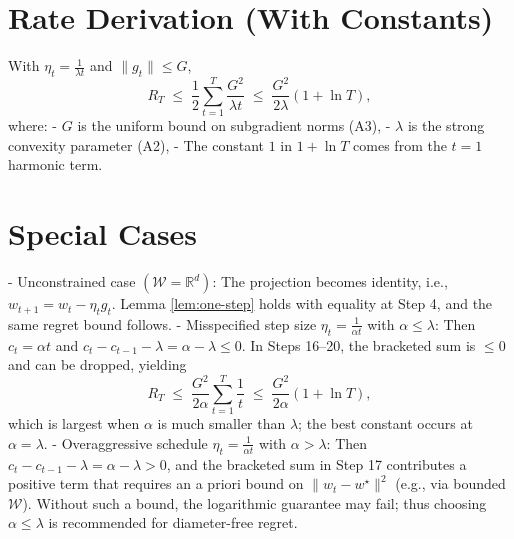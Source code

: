 \documentclass[12pt]{article}
\begin{document}
\section*{Rate Derivation (With Constants)}
With $\eta_t = \frac{1}{\lambda t}$ and $\|g_t\|\le G$,
\[
R_T \;\le\; \frac{1}{2}\sum_{t=1}^T \frac{G^2}{\lambda t} 
\;\le\; \frac{G^2}{2\lambda}\left(1+\ln T\right),
\]
where:
- $G$ is the uniform bound on subgradient norms (A3),
- $\lambda$ is the strong convexity parameter (A2),
- The constant $1$ in $1+\ln T$ comes from the $t=1$ harmonic term.

\section*{Special Cases}
- Unconstrained case $(\mathcal{W}=\mathbb{R}^d)$: The projection becomes identity, i.e., $w_{t+1}=w_t - \eta_t g_t$. Lemma \ref{lem:one-step} holds with equality at Step 4, and the same regret bound follows.
- Misspecified step size $\eta_t = \frac{1}{\alpha t}$ with $\alpha \le \lambda$: Then $c_t=\alpha t$ and $c_t-c_{t-1}-\lambda = \alpha - \lambda \le 0$. In Steps 16--20, the bracketed sum is $\le 0$ and can be dropped, yielding
\[
R_T \;\le\; \frac{G^2}{2\alpha}\sum_{t=1}^T \frac{1}{t} \;\le\; \frac{G^2}{2\alpha}\left(1+\ln T\right),
\]
which is largest when $\alpha$ is much smaller than $\lambda$; the best constant occurs at $\alpha=\lambda$.
- Overaggressive schedule $\eta_t = \frac{1}{\alpha t}$ with $\alpha>\lambda$: Then $c_t-c_{t-1}-\lambda=\alpha-\lambda>0$, and the bracketed sum in Step 17 contributes a positive term that requires an a priori bound on $\|w_t-w^\star\|^2$ (e.g., via bounded $\mathcal{W}$). Without such a bound, the logarithmic guarantee may fail; thus choosing $\alpha\le \lambda$ is recommended for diameter-free regret.
\end{document}
